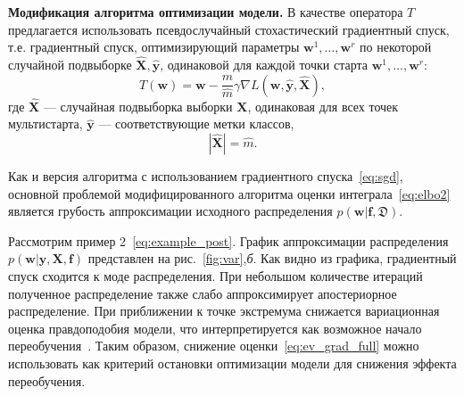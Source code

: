 




\textbf{Модификация алгоритма оптимизации модели.} 
В качестве оператора $T$ предлагается использовать псевдослучайный стохастический градиентный спуск, т.е. градиентный спуск, оптимизирующий параметры $\mathbf{w}^1,\dots,\mathbf{w}^r$ по некоторой случайной подвыборке $\hat{\mathbf{X}}, \hat{\mathbf{y}}$, одинаковой для каждой точки старта $\mathbf{w}^1,\dots,\mathbf{w}^r$:
\begin{equation}
    \label{eq:sgd}
	T(\mathbf{w}) = \mathbf{w} -  \frac{m}{\hat{m}} \gamma \nabla L(\mathbf{w}, \hat{\mathbf{y}}, \hat{\mathbf{X}}),	
\end{equation}
где $\hat{\mathbf{X}}$ --- случайная подвыборка выборки ${\mathbf{X}}$, одинаковая для всех точек мультистарта, $\hat{\mathbf{y}}$ --- соответствующие метки классов, $$|\hat{\mathbf{X}}| = \hat{m}.$$

Как и версия алгоритма с использованием градиентного спуска~\eqref{eq:sgd}, основной проблемой модифицированного алгоритма оценки интеграла~\eqref{eq:elbo2} является грубость аппроксимации исходного распределения $p(\mathbf{w}|\mathbf{f},\mathfrak{D})$.

Рассмотрим пример 2~\eqref{eq:example_post}.
График аппроксимации распределения $p(\mathbf{w}|\mathbf{y}, \mathbf{X}, \mathbf{f})$ представлен на рис.~\ref{fig:var},\textit{б}.
Как видно из графика, градиентный спуск сходится к моде распределения. При небольшом количестве итераций полученное распределение также слабо аппроксимирует апостериорное распределение. {При приближении к точке экстремума снижается вариационная оценка правдоподобия модели, что  интерпретируется как возможное начало переобучения~\cite{early}. Таким образом, снижение оценки~\eqref{eq:ev_grad_full} можно использовать как критерий остановки оптимизации модели для снижения эффекта переобучения.  }

